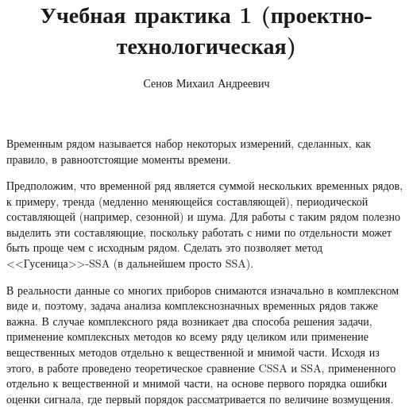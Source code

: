 \documentclass[specialist,
               substylefile = spbu.rtx,
               subf,href,colorlinks=true, 12pt]{disser}
\begin{document}
%
	
	
	\title{Учебная практика 1 (проектно-технологическая)}
	
	
	\author{Сенов Михаил Андреевич}
	
	
	
	\date{\number\year}
	
	\maketitle




\intro
Временным рядом называется набор некоторых измерений, сделанных, как правило, в равноотстоящие моменты времени.

Предположим, что временной ряд является суммой нескольких временных рядов, к примеру, тренда (медленно меняющейся составляющей), периодической составляющей (например, сезонной) и шума. Для работы с таким рядом полезно выделить эти составляющие, поскольку работать с ними по отдельности может быть проще чем с исходным рядом. Сделать это позволяет метод <<Гусеница>>-SSA (в дальнейшем просто SSA).

В реальности данные со многих приборов снимаются изначально в комплексном виде и, поэтому, задача анализа комплекснозначных временных рядов также важна. В случае комплексного ряда возникает два способа решения задачи, применение комплексных методов ко всему ряду целиком или применение вещественных методов отдельно к вещественной и мнимой части. Исходя из этого, в работе проведено теоретическое сравнение CSSA и SSA, примененного отдельно к вещественной и мнимой части, на основе первого порядка ошибки оценки сигнала, где первый порядок рассматривается по величине возмущения.
\end{document}
